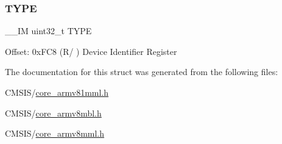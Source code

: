 \subsubsection{\texorpdfstring{TYPE}{TYPE}}
{\footnotesize\ttfamily \+\_\+\+\_\+\+IM uint32\+\_\+t T\+Y\+PE}

Offset\+: 0x\+F\+C8 (R/ ) Device Identifier Register 

The documentation for this struct was generated from the following files\+:\begin{DoxyCompactItemize}
\item 
C\+M\+S\+I\+S/\mbox{\hyperlink{core__armv81mml_8h}{core\+\_\+armv81mml.\+h}}\item 
C\+M\+S\+I\+S/\mbox{\hyperlink{core__armv8mbl_8h}{core\+\_\+armv8mbl.\+h}}\item 
C\+M\+S\+I\+S/\mbox{\hyperlink{core__armv8mml_8h}{core\+\_\+armv8mml.\+h}}\end{DoxyCompactItemize}
